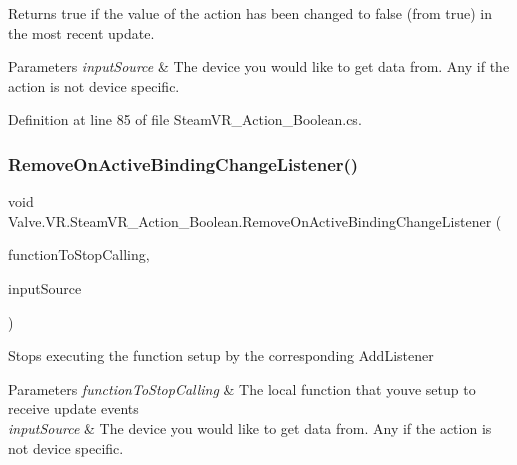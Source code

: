 Returns true if the value of the action has been changed to false (from true) in the most recent update. 


\begin{DoxyParams}{Parameters}
{\em input\+Source} & The device you would like to get data from. Any if the action is not device specific.\\
\hline
\end{DoxyParams}


Definition at line 85 of file Steam\+V\+R\+\_\+\+Action\+\_\+\+Boolean.\+cs.

\mbox{\label{class_valve_1_1_v_r_1_1_steam_v_r___action___boolean_ae2ada673d90157f6f51c401f22612860}} 
\subsubsection{\texorpdfstring{RemoveOnActiveBindingChangeListener()}{RemoveOnActiveBindingChangeListener()}}
{\footnotesize\ttfamily void Valve.\+V\+R.\+Steam\+V\+R\+\_\+\+Action\+\_\+\+Boolean.\+Remove\+On\+Active\+Binding\+Change\+Listener (\begin{DoxyParamCaption}\item[{\mbox{\hyperlink{class_valve_1_1_v_r_1_1_steam_v_r___action___boolean_af9f3044d5e4868485945b70d907c6bbb}{Active\+Change\+Handler}}}]{function\+To\+Stop\+Calling,  }\item[{\mbox{\hyperlink{namespace_valve_1_1_v_r_a82e5bf501cc3aa155444ee3f0662853f}{Steam\+V\+R\+\_\+\+Input\+\_\+\+Sources}}}]{input\+Source }\end{DoxyParamCaption})}



Stops executing the function setup by the corresponding Add\+Listener 


\begin{DoxyParams}{Parameters}
{\em function\+To\+Stop\+Calling} & The local function that you\textquotesingle{}ve setup to receive update events\\
\hline
{\em input\+Source} & The device you would like to get data from. Any if the action is not device specific.\\
\hline
\end{DoxyParams}


